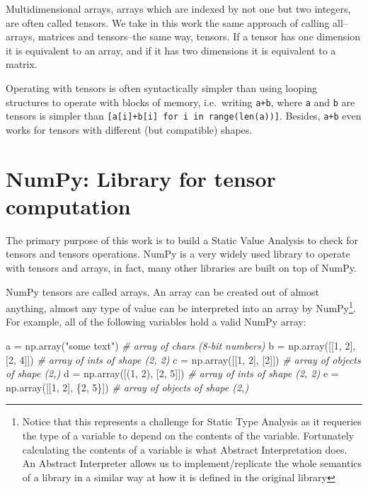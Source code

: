 \documentclass[
11pt, %
english, %
singlespacing, %
headsepline, %
]{MastersDoctoralThesis} %
\newenvironment{Shaded}{}{}
\newcommand{\CommentTok}[1]{\textcolor[rgb]{0.38,0.63,0.69}{\textit{#1}}}
\newcommand{\DecValTok}[1]{\textcolor[rgb]{0.25,0.63,0.44}{#1}}
\newcommand{\NormalTok}[1]{#1}
\newcommand{\OperatorTok}[1]{\textcolor[rgb]{0.40,0.40,0.40}{#1}}
\newcommand{\StringTok}[1]{\textcolor[rgb]{0.25,0.44,0.63}{#1}}
\begin{document}
Multidimensional arrays, arrays which are indexed by not one but two
integers, are often called tensors. We take in this work the same
approach of calling all--arrays, matrices and tensors--the same way,
tensors. If a tensor has one dimension it is equivalent to an array, and
if it has two dimensions it is equivalent to a matrix.

Operating with tensors is often syntactically simpler than using looping
structures to operate with blocks of memory, i.e.~writing \texttt{a+b},
where \texttt{a} and \texttt{b} are tensors is simpler than
\texttt{{[}a{[}i{]}+b{[}i{]}\ for\ i\ in\ range(len(a)){]}}. Besides,
\texttt{a+b} even works for tensors with different (but compatible)
shapes.

\hypertarget{numpy-library-for-tensor-computation}{%
\section{NumPy: Library for tensor
computation}\label{numpy-library-for-tensor-computation}}

The primary purpose of this work is to build a Static Value Analysis to
check for tensors and tensors operations. NumPy
\autocite{oliphant2006guide} is a very widely used library to operate
with tensors and arrays, in fact, many other libraries are built on top
of NumPy.

NumPy tensors are called arrays. An array can be created out of almost
anything, almost any type of value can be interpreted into an array by
NumPy\footnote{Notice that this represents a challenge for Static Type
  Analysis as it requeries the type of a variable to depend on the
  contents of the variable. Fortunately calculating the contents of a
  variable is what Abstract Interpretation does. An Abstract Interpreter
  allows us to implement/replicate the whole semantics of a library in a
  similar way at how it is defined in the original library}. For
example, all of the following variables hold a valid NumPy array:

\begin{Shaded}
\begin{Highlighting}[]
\NormalTok{a }\OperatorTok{=}\NormalTok{ np.array(}\StringTok{"some text"}\NormalTok{)       }\CommentTok{# array of chars (8-bit numbers)}
\NormalTok{b }\OperatorTok{=}\NormalTok{ np.array([[}\DecValTok{1}\NormalTok{, }\DecValTok{2}\NormalTok{], [}\DecValTok{2}\NormalTok{, }\DecValTok{4}\NormalTok{]])  }\CommentTok{# array of ints of shape (2, 2)}
\NormalTok{c }\OperatorTok{=}\NormalTok{ np.array([[}\DecValTok{1}\NormalTok{, }\DecValTok{2}\NormalTok{], [}\DecValTok{2}\NormalTok{]])     }\CommentTok{# array of objects of shape (2,)}
\NormalTok{d }\OperatorTok{=}\NormalTok{ np.array([(}\DecValTok{1}\NormalTok{, }\DecValTok{2}\NormalTok{), [}\DecValTok{2}\NormalTok{, }\DecValTok{5}\NormalTok{]])  }\CommentTok{# array of ints of shape (2, 2)}
\NormalTok{e }\OperatorTok{=}\NormalTok{ np.array([[}\DecValTok{1}\NormalTok{, }\DecValTok{2}\NormalTok{], \{}\DecValTok{2}\NormalTok{, }\DecValTok{5}\NormalTok{\}])     }\CommentTok{# array of objects of shape (2,)}
\end{Highlighting}
\end{Shaded}
\end{document}
